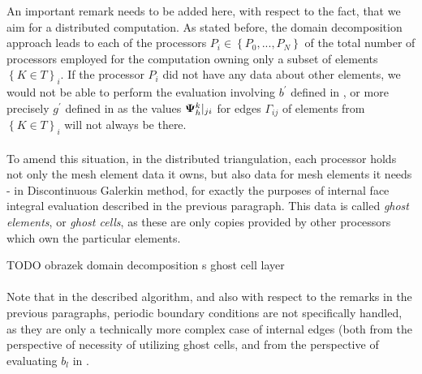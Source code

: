 An important remark needs to be added here, with respect to the fact, that we aim for a distributed computation. As stated before, the domain decomposition approach leads to each of the processors $P_i \in \left\{P_0, ..., P_N\right\}$ of the total number of processors employed for the computation owning only a subset of elements $\left\{K \in T\right\}_i$. If the processor $P_i$ did not have any data about other elements, we would not be able to perform the evaluation involving $b^{'}$ defined in , or more precisely $g^{'}$ defined in  as the values ${\mathrm{\mathbf{\Psi}}_h^{k}}|_{ji}$ for edges $\Gamma_{ij}$ of elements from $\left\{K \in T\right\}_i$ will not always be there.
\paragraph{}
To amend this situation, in the distributed triangulation, each processor holds not only the mesh element data it owns, but also data for mesh elements it needs - in Discontinuous Galerkin method, for exactly the purposes of internal face integral evaluation described in the previous paragraph. This data is called \textit{ghost elements}, or \textit{ghost cells}, as these are only copies provided by other processors which own the particular elements.

TODO obrazek domain decomposition s ghost cell layer

\paragraph{}
Note that in the described algorithm, and also with respect to the remarks in the previous paragraphs, periodic boundary conditions are not specifically handled, as they are only a technically more complex case of internal edges (both from the perspective of necessity of utilizing ghost cells, and from the perspective of evaluating $b_{l}$ in .